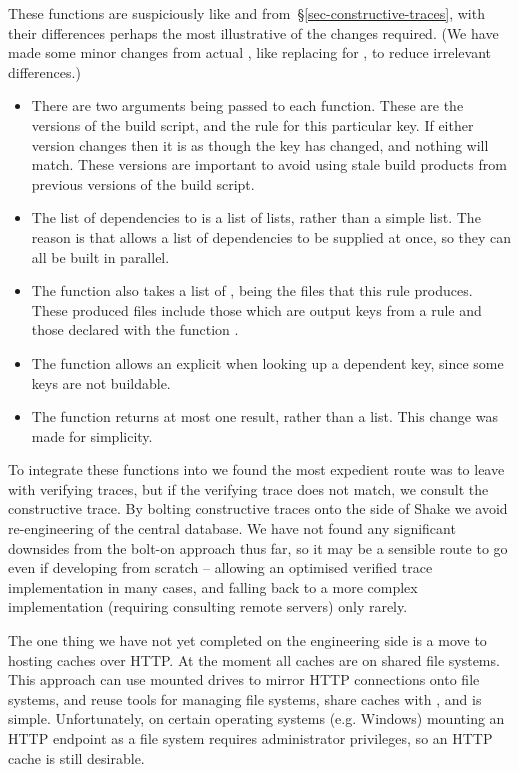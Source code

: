 \noindent
These functions are suspiciously like  and 
from~\S\ref{sec-constructive-traces}, with their differences perhaps the most
illustrative of the changes required. (We have made some minor changes from
actual \Shake, like replacing  for , to reduce irrelevant
differences.)

\begin{itemize}
\item There are two  arguments being passed to each function. These are
      the versions of the build script, and the rule for this particular key. If
      either version changes then it is as though the key has changed, and
      nothing will match. These versions are important to avoid using stale
      build products from previous versions of the build script.
\item The list of dependencies to  is a list of lists, rather than
      a simple list. The reason is that \Shake allows a list of dependencies to
      be supplied at once, so they can all be built in parallel.
\item The  function also takes a list of , being the
      files that this rule produces. These produced files include those which
      are output keys from a rule and those declared with the function
      .
\item The  function allows an explicit  when looking
      up a dependent key, since some keys are not buildable.
\item The  function returns at most one result, rather than a
      list. This change was made for simplicity.
\end{itemize}

To integrate these functions into \Shake we found the most expedient route was
to leave \Shake with verifying traces, but if the verifying trace does not
match, we consult the constructive trace. By bolting constructive traces onto
the side of Shake we avoid re-engineering of the central database. We have not
found any significant downsides from the bolt-on approach thus far, so it may be
a sensible route to go even if developing from scratch -- allowing an optimised
verified trace implementation in many cases, and falling back to a more complex
implementation (requiring consulting remote servers) only rarely.

The one thing we have not yet completed on the engineering side is a move to
hosting caches over HTTP. At the moment all caches are on shared file systems.
This approach can use mounted drives to mirror HTTP connections onto file
systems, and reuse tools for managing file systems, share caches with
, and is simple. Unfortunately, on certain operating systems (e.g.
Windows) mounting an HTTP endpoint as a file system requires administrator
privileges, so an HTTP cache is still desirable.

